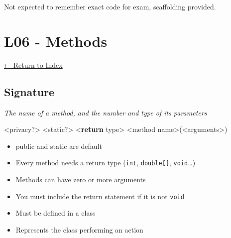 \documentclass[]{article}
\newenvironment{Shaded}{}{}
\newcommand{\BuiltInTok}[1]{#1}
\newcommand{\DataTypeTok}[1]{\textcolor[rgb]{0.56,0.13,0.00}{#1}}
\newcommand{\DecValTok}[1]{\textcolor[rgb]{0.25,0.63,0.44}{#1}}
\newcommand{\FunctionTok}[1]{\textcolor[rgb]{0.02,0.16,0.49}{#1}}
\newcommand{\ImportTok}[1]{#1}
\newcommand{\KeywordTok}[1]{\textcolor[rgb]{0.00,0.44,0.13}{\textbf{#1}}}
\newcommand{\NormalTok}[1]{#1}
\newcommand{\SpecialCharTok}[1]{\textcolor[rgb]{0.25,0.44,0.63}{#1}}
\newcommand{\StringTok}[1]{\textcolor[rgb]{0.25,0.44,0.63}{#1}}
\providecommand{\tightlist}{%
  \setlength{\itemsep}{0pt}\setlength{\parskip}{0pt}}
\begin{document}
\begin{Shaded}
\end{Shaded}

Not expected to remember exact code for exam, scaffolding provided.

\hypertarget{l06---methods}{%
\section{L06 - Methods}\label{l06---methods}}

\protect\hyperlink{table-of-contents}{← Return to Index}

\hypertarget{signature}{%
\subsection{Signature}\label{signature}}

\emph{The name of a method, and the number and type of its parameters}

\begin{Shaded}
\begin{Highlighting}[]
\NormalTok{<privacy?> <}\DataTypeTok{static}\NormalTok{?> <}\KeywordTok{return}\NormalTok{ type> <method name>(<arguments>)}
\end{Highlighting}
\end{Shaded}

\begin{itemize}
\tightlist
\item
  public and static are default
\item
  Every method needs a return type (\texttt{int}, \texttt{double{[}{]}},
  \texttt{void}\ldots{})
\item
  Methods can have zero or more arguments
\item
  You must include the return statement if it is not \texttt{void}
\item
  Must be defined in a class
\item
  Represents the class performing an action
\end{itemize}
\end{document}
